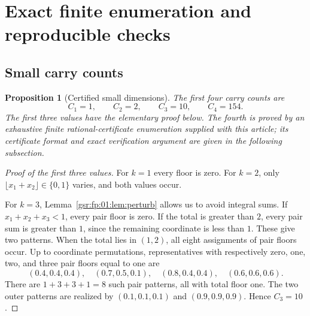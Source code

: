 \documentclass[11pt,letterpaper]{article}
\numberwithin{equation}{section}
\newtheorem{proposition}[theorem]{Proposition}
\theoremstyle{definition}
\theoremstyle{remark}
\newcommand{\1}{\mathbf 1}
\newcommand{\srctag}[1]{\texorpdfstring{\enspace\textup{[#1]}}{ [#1]}}
\newcommand{\srcnote}[2]{\par\noindent{\small\textit{Source #1, delivered #2.}}\par}
\begin{document}
\section[{Exact finite enumeration and reproducible checks\srctag{01}}]{Exact finite enumeration and reproducible checks}\label{gsr:fp:01:sec:d13}\label{gsr:fp:01:sec:cert}
\srcnote{01}{Section 13}

\subsection{Small carry counts}

\begin{proposition}[Certified small dimensions]\label{gsr:fp:01:prop:counts}
The first four carry counts are
\begin{equation}\label{gsr:fp:01:eq:counts}
 C_1=1,\qquad C_2=2,\qquad C_3=10,\qquad C_4=154.
\end{equation}
The first three values have the elementary proof below. The fourth is
proved by an exhaustive finite rational-certificate enumeration supplied
with this article; its certificate format and exact verification argument
are given in the following subsection.
\end{proposition}
\begin{proof}[Proof of the first three values]
For $k=1$ every floor is zero. For $k=2$, only
$\lfloor x_1+x_2\rfloor\in\{0,1\}$ varies, and both values occur.

For $k=3$, Lemma~\ref{gsr:fp:01:lem:perturb} allows us to avoid integral sums.
If $x_1+x_2+x_3<1$, every pair floor is zero. If the total is greater
than $2$, every pair sum is greater than $1$, since the remaining
coordinate is less than $1$. These give two patterns.
When the total lies in $(1,2)$, all eight assignments of pair floors
occur. Up to coordinate permutations, representatives with respectively
zero, one, two, and three pair floors equal to one are
\[
 (0.4,0.4,0.4),\quad (0.7,0.5,0.1),\quad
 (0.8,0.4,0.4),\quad(0.6,0.6,0.6).
\]
There are $1+3+3+1=8$ such pair patterns, all with total floor one.
The two outer patterns are realized by $(0.1,0.1,0.1)$ and
$(0.9,0.9,0.9)$. Hence $C_3=10$.
\end{proof}
\end{document}
